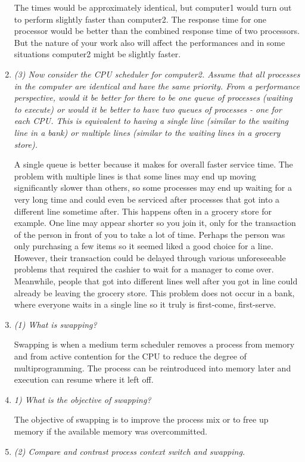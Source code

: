 \documentclass[letterpaper,11pt]{article}
\begin{document}
\begin{enumerate}
  The times would be approximately identical, but computer1 would turn out to perform slightly faster than computer2.  The response time for one processor would be better than the combined response time of two processors.  But the nature of your work also will affect the performances and in some situations computer2 might be slightly faster.
  \item \emph{(3) Now consider the CPU scheduler for computer2. Assume that all processes in the computer are identical and have the same priority. From a performance perspective, would it be better for there to be one queue of processes (waiting to execute) or would it be better to have two queues of processes - one for each CPU. This is equivalent to having a single line (similar to the waiting line in a bank) or multiple lines (similar to the waiting lines in a grocery store).}

  A single queue is better because it makes for overall faster service time.  The problem with multiple lines is that some lines may end up moving significantly slower than others, so some processes may end up waiting for a very long time and could even be serviced after processes that got into a different line sometime after.  This happens often in a grocery store for example.  One line may appear shorter so you join it, only for the transaction of the person in front of you to take a lot of time.  Perhaps the person was only purchasing a few items so it seemed liked a good choice for a line.  However, their transaction could be delayed through various unforeseeable problems that required the cashier to wait for a manager to come over.  Meanwhile, people that got into different lines well after you got in line could already be leaving the grocery store.  This problem does not occur in a bank, where everyone waits in a single line so it truly is first-come, first-serve.
  \item \emph{(1) What is swapping?}

  Swapping is when a medium term scheduler removes a process from memory and from active contention for the CPU to reduce the degree of multiprogramming.  The process can be reintroduced into memory later and execution can resume where it left off.
  \item \emph{1) What is the objective of swapping?}

  The objective of swapping is to improve the process mix or to free up memory if the available memory was overcommitted.
  \item \emph{(2) Compare and contrast process context switch and swapping.}


\end{enumerate}
\end{document}
